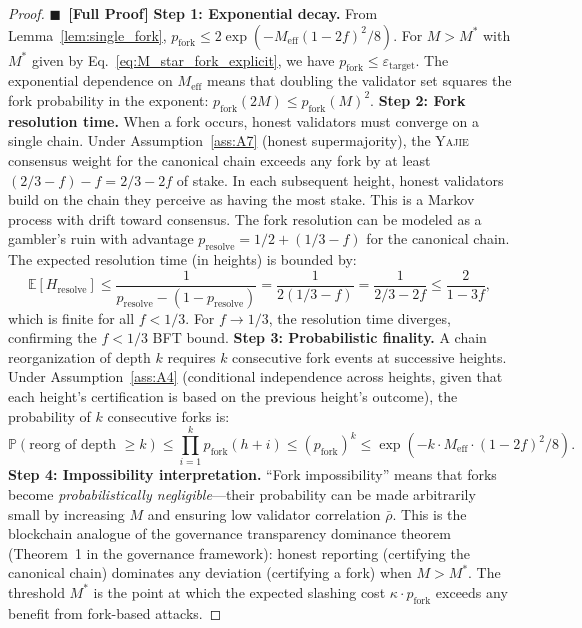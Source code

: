 \documentclass[11pt,a4paper]{article}
\theoremstyle{definition}
\newcommand{\rigorFull}[0]{$\blacksquare$~\textbf{[Full Proof]}}
\newcommand{\Yajie}{\textsc{Yajie}}
\newcommand{\E}{\mathbb{E}}
\newcommand{\Pbb}{\mathbb{P}}
\newcommand{\mthreshold}{M^{*}}
\begin{document}
\begin{proof}\rigorFull
\textbf{Step 1: Exponential decay.} From Lemma~\ref{lem:single_fork}, $p_{\mathrm{fork}} \leq 2 \exp(-M_{\mathrm{eff}}(1-2f)^2 / 8)$. For $M > \mthreshold$ with $\mthreshold$ given by Eq.~\eqref{eq:M_star_fork_explicit}, we have $p_{\mathrm{fork}} \leq \varepsilon_{\mathrm{target}}$. The exponential dependence on $M_{\mathrm{eff}}$ means that doubling the validator set squares the fork probability in the exponent: $p_{\mathrm{fork}}(2M) \leq p_{\mathrm{fork}}(M)^2$.
\textbf{Step 2: Fork resolution time.} When a fork occurs, honest validators must converge on a single chain. Under Assumption~\ref{ass:A7} (honest supermajority), the \Yajie{} consensus weight for the canonical chain exceeds any fork by at least $(2/3 - f) - f = 2/3 - 2f$ of stake. In each subsequent height, honest validators build on the chain they perceive as having the most stake. This is a Markov process with drift toward consensus.
The fork resolution can be modeled as a gambler's ruin with advantage $p_{\mathrm{resolve}} = 1/2 + (1/3 - f)$ for the canonical chain. The expected resolution time (in heights) is bounded by:
\begin{equation}
    \E[H_{\mathrm{resolve}}] \leq \frac{1}{p_{\mathrm{resolve}} - (1 - p_{\mathrm{resolve}})} = \frac{1}{2(1/3 - f)} = \frac{1}{2/3 - 2f} \leq \frac{2}{1 - 3f},
    \label{eq:resolve_time}
\end{equation}
which is finite for all $f < 1/3$. For $f \to 1/3$, the resolution time diverges, confirming the $f < 1/3$ BFT bound.
\textbf{Step 3: Probabilistic finality.} A chain reorganization of depth $k$ requires $k$ consecutive fork events at successive heights. Under Assumption~\ref{ass:A4} (conditional independence across heights, given that each height's certification is based on the previous height's outcome), the probability of $k$ consecutive forks is:
\begin{equation}
    \Pbb(\text{reorg of depth } \geq k) \leq \prod_{i=1}^{k} p_{\mathrm{fork}}(h+i) \leq (p_{\mathrm{fork}})^k \leq \exp(-k \cdot M_{\mathrm{eff}} \cdot (1-2f)^2 / 8).
    \label{eq:finality}
\end{equation}
\textbf{Step 4: Impossibility interpretation.} ``Fork impossibility'' means that forks become \textit{probabilistically negligible}—their probability can be made arbitrarily small by increasing $M$ and ensuring low validator correlation $\bar{\rho}$. This is the blockchain analogue of the governance transparency dominance theorem (Theorem~1 in the governance framework): honest reporting (certifying the canonical chain) dominates any deviation (certifying a fork) when $M > \mthreshold$. The threshold $\mthreshold$ is the point at which the expected slashing cost $\kappa \cdot p_{\mathrm{fork}}$ exceeds any benefit from fork-based attacks.

\end{proof}
\end{document}
